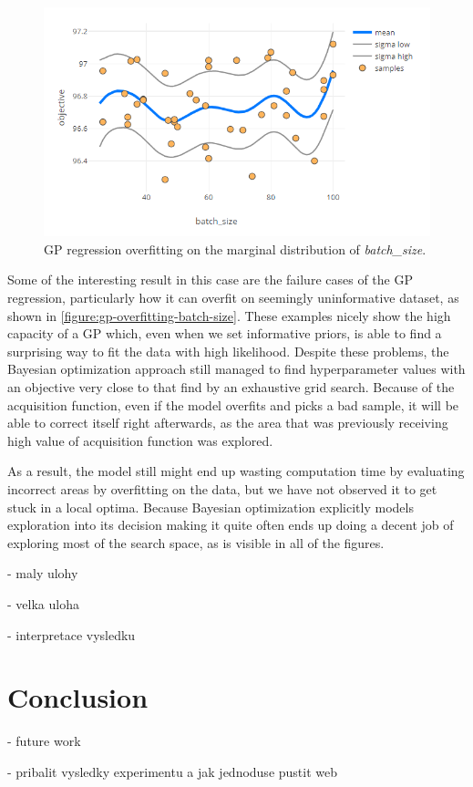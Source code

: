 \begin{figure}
	\begin{center}
		\includegraphics[width=1.0\textwidth]{images/gp-overfitting-batch-size.png}
		\caption{GP regression overfitting on the marginal distribution of \emph{batch\_size}.}
		\label{figure:gp-overfitting-batch-size}
	\end{center}
\end{figure}

Some of the interesting result in this case are the failure cases of the GP regression, particularly how it can overfit on seemingly uninformative dataset, as shown in \autoref{figure:gp-overfitting-batch-size}. These examples nicely show the high capacity of a GP which, even when we set informative priors, is able to find a surprising way to fit the data with high likelihood. Despite these problems, the Bayesian optimization approach still managed to find hyperparameter values with an objective very close to that find by an exhaustive grid search. Because of the acquisition function, even if the model overfits and picks a bad sample, it will be able to correct itself right afterwards, as the area that was previously receiving high value of acquisition function was explored.

As a result, the model still might end up wasting computation time by evaluating incorrect areas by overfitting on the data, but we have not observed it to get stuck in a local optima. Because Bayesian optimization explicitly models exploration into its decision making it quite often ends up doing a decent job of exploring most of the search space, as is visible in all of the figures.



- maly ulohy

- velka uloha

- interpretace vysledku
\\


\chapter{Conclusion}

- future work

- pribalit vysledky experimentu a jak jednoduse pustit web
